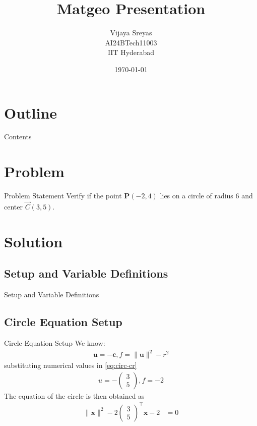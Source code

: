 \documentclass{beamer}
\title{Matgeo Presentation}
\author{Vijaya Sreyas \\ AI24BTech11003 \\ IIT Hyderabad}
\date{\today}
\providecommand{\brak}[1]{\ensuremath{\left(#1\right)}}
\theoremstyle{remark}
\providecommand{\norm}[1]{\lVert#1\rVert}
\newcommand{\myvec}[1]{\ensuremath{\begin{pmatrix}#1\end{pmatrix}}}
\let\vec\mathbf
\numberwithin{equation}{section}
\begin{document}
\begin{frame}
\titlepage
\end{frame}

\section*{Outline}
\begin{frame}{Contents}
\tableofcontents    
\end{frame}

\section{Problem}
\begin{frame}{Problem Statement}
    Verify if the point $\vec{P}\brak{-2,4}$ lies on a circle of radius $6$ and center $\Vec{C}\brak{3,5}$.
\end{frame}

\section{Solution}
\subsection{Setup and Variable Definitions}
\begin{frame}{Setup and Variable Definitions}
\begin{table}[h!]    
  \centering
  
  \caption{Variables and given data}
\end{table}
\end{frame}

\subsection{Circle Equation Setup}
\begin{frame}{Circle Equation Setup}
    We know:
    \begin{align}
        \vec{u} = -\vec{c}, f=\norm{\vec{u}}^2-r^2
        \label{eq:circ-cr}
    \end{align}
    substituting numerical values in \eqref{eq:circ-cr}
    \begin{align}
        u=-\myvec{3 \\ 5}, f=-2
    \end{align}
    The equation of the circle is then obtained as 
    \begin{align}
        \norm{\vec{x}}^2 -2 \myvec{3 \\ 5}^\top \vec{x} -2 &=0
        \label{eq:circ}
    \end{align}
\end{frame}
\end{document}
